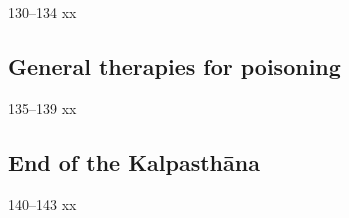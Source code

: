 \begin{translation}
 \item [130--134] xx
 
\subsection{General therapies for poisoning}

\item [135--139] xx

\subsection{End of the Kalpasthāna}

\item[140--143] xx
 
\end{translation}